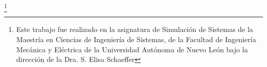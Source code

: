 \documentclass[preprint,12pt]{elsarticle}
\begin{document}



\begin{thebibliography}{00}



\end{thebibliography}

\thanks{Este trabajo fue realizado en la asignatura de Simulación de Sistemas de la Maestría en Ciencias de Ingeniería de Sistemas, de la Facultad de Ingeniería Mecánica y Eléctrica de la Universidad Autónoma de Nuevo León bajo la dirección de la Dra. S. Elisa Schaeffer}
\end{document}
